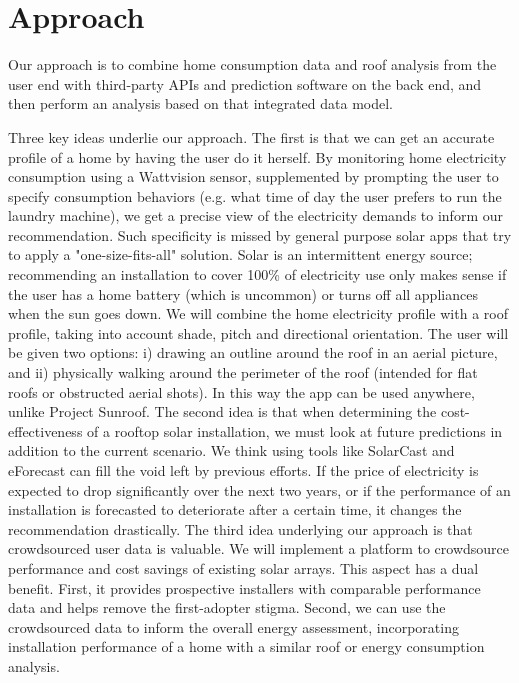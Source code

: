 \documentclass[pageno]{jpaper}
\begin{document}
\section{Approach}

\indent Our approach is to combine home consumption data and roof analysis from the user end with third-party APIs and prediction software on the back end, and then perform an analysis based on that integrated data model. \newline

Three key ideas underlie our approach. The first is that we can get an accurate profile of a home by having the user do it herself. By monitoring home electricity consumption using a Wattvision sensor, supplemented by prompting the user to specify consumption behaviors (e.g. what time of day the user prefers to run the laundry machine), we get a precise view of the electricity demands to inform our recommendation. Such specificity is missed by general purpose solar apps that try to apply a "one-size-fits-all" solution. Solar is an intermittent energy source; recommending an installation to cover 100\% of electricity use only makes sense if the user has a home battery (which is uncommon) or turns off all appliances when the sun goes down. We will combine the home electricity profile with a roof profile, taking into account shade, pitch and directional orientation. The user will be given two options: i) drawing an outline around the roof in an aerial picture, and ii) physically walking around the perimeter of the roof (intended for flat roofs or obstructed aerial shots). In this way the app can be used anywhere, unlike Project Sunroof. \newline
\newline
\indent The second idea is that when determining the cost-effectiveness of a rooftop solar installation, we must look at future predictions in addition to the current scenario. We think using tools like SolarCast and eForecast can fill the void left by previous efforts. If the price of electricity is expected to drop significantly over the next two years, or if the performance of an installation is forecasted to deteriorate after a certain time, it changes the recommendation drastically. \newline
\newline
\indent The third idea underlying our approach is that crowdsourced user data is valuable. We will implement a platform to crowdsource performance and cost savings of existing solar arrays. This aspect has a dual benefit. First, it provides prospective installers with comparable performance data and helps remove the first-adopter stigma. Second, we can use the crowdsourced data to inform the overall energy assessment, incorporating installation performance of a home with a similar roof or energy consumption analysis.
\end{document}
